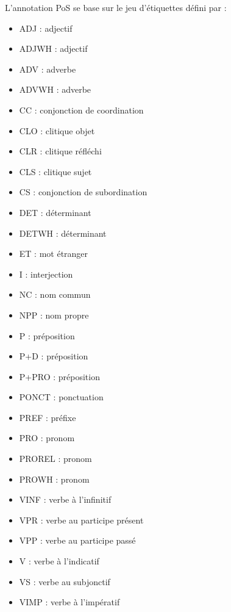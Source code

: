 \documentclass[manual-fr.tex]{subfiles}
\begin{document}
L'annotation PoS se base sur le jeu d'étiquettes défini par \cite{Crabbe08} :\\

\begin{minipage}{0.49\linewidth}
	\begin{itemize}
		\item[] ADJ : adjectif
		\item[] ADJWH : adjectif
		\item[] ADV : adverbe
		\item[] ADVWH : adverbe
		\item[] CC : conjonction de coordination
		\item[] CLO : clitique objet
		\item[] CLR : clitique réfléchi
		\item[] CLS : clitique sujet
		\item[] CS : conjonction de subordination
		\item[] DET : déterminant
		\item[] DETWH : déterminant 
		\item[] ET : mot étranger
		\item[] I : interjection
		\item[] NC : nom commun
		\item[] NPP : nom propre
	\end{itemize}
\end{minipage}
\begin{minipage}{0.49\linewidth}
	\begin{itemize}
		\item[] P : préposition 
		\item[] P+D : préposition 
		\item[] P+PRO : préposition 
		\item[] PONCT : ponctuation
		\item[] PREF : préfixe
		\item[] PRO : pronom 
		\item[] PROREL : pronom 
		\item[] PROWH : pronom 
		\item[] VINF : verbe à l'infinitif
		\item[] VPR : verbe au participe présent
		\item[] VPP : verbe au participe passé
		\item[] V : verbe à l'indicatif
		\item[] VS : verbe au subjonctif
		\item[] VIMP : verbe à l'impératif
	\end{itemize}
\end{minipage}
\end{document}
